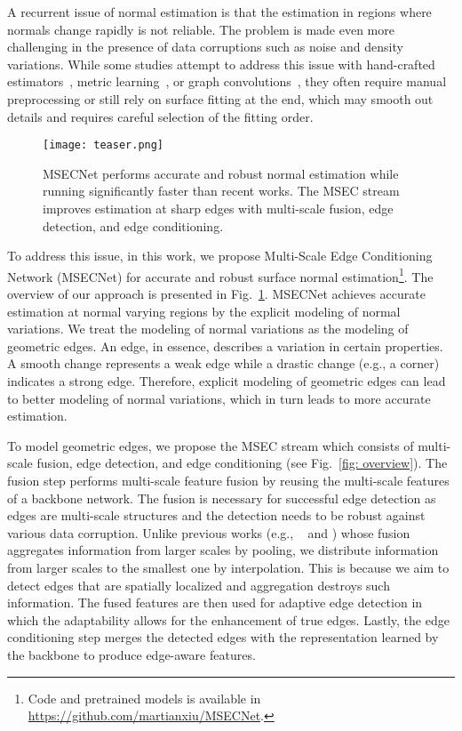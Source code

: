 \documentclass[sigconf]{acmart}
\begin{document}
A recurrent issue of normal estimation is that the estimation in regions where normals change rapidly is not reliable. The problem is made even more challenging in the presence of data corruptions such as noise and density variations.
While some studies attempt to address this issue with hand-crafted estimators~\cite{zhou2022refine}, metric learning~\cite{wang2022deep}, or graph convolutions~\cite{li2022graphfit}, they often require manual preprocessing or still rely on surface fitting at the end, which may smooth out details and requires careful selection of the fitting order.   


\begin{figure}[t]
    \centering
    \texttt{[image: teaser.png]}
    \caption{MSECNet performs accurate and robust normal estimation while running significantly faster than recent works. The MSEC stream improves estimation at sharp edges with multi-scale fusion, edge detection, and edge conditioning. }
    \label{fig: teaser}
\end{figure}

To address this issue, in this work, we propose Multi-Scale Edge Conditioning Network (MSECNet) for accurate and robust surface normal estimation\footnote{Code and pretrained models is available in \url{https://github.com/martianxiu/MSECNet}.}. 
The overview of our approach is presented in Fig.~\ref{fig: teaser}. 
MSECNet achieves accurate estimation at normal varying regions by the explicit modeling of normal variations. 
We treat the modeling of normal variations as the modeling of geometric edges. An edge, in essence, describes a variation in certain properties. 
A smooth change represents a weak edge while a drastic change (e.g., a corner) indicates a strong edge. 
Therefore, explicit modeling of geometric edges can lead to better modeling of normal variations, which in turn leads to more accurate estimation. 


To model geometric edges, we propose the MSEC stream which consists of multi-scale fusion, edge detection, and edge conditioning (see Fig.~\ref{fig: overview}).
The fusion step performs multi-scale feature fusion by reusing the multi-scale features of a backbone network. The fusion is necessary for successful edge detection as edges are multi-scale structures and the detection needs to be robust against various data corruption. 
Unlike previous works (e.g., ~\cite{zhu2021adafit} and \cite{li2022hsurf}) whose fusion aggregates information from larger scales by pooling, we distribute information from larger scales to the smallest one by interpolation. This is because we aim to detect edges that are spatially localized and aggregation destroys such information. 
The fused features are then used for adaptive edge detection in which the adaptability allows for the enhancement of true edges.
Lastly, the edge conditioning step merges the detected edges with the representation learned by the backbone to produce edge-aware features.   
\end{document}

